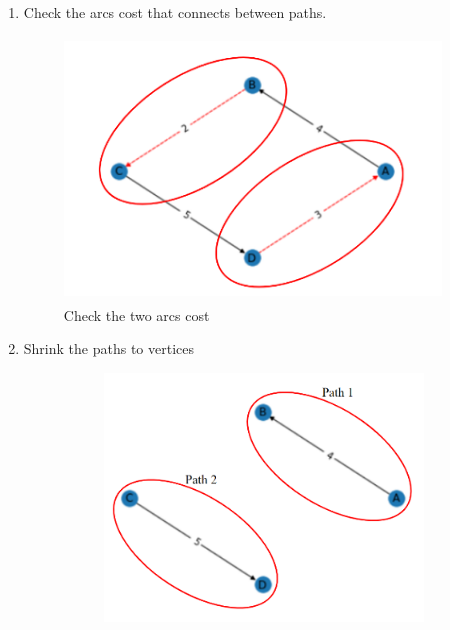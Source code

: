 \documentclass{article}
\begin{document}
\begin{enumerate}
    \item Check the arcs cost that connects between paths.
    \begin{figure}[H]
        \centering
        \includegraphics[width=10cm,height=7cm]{ex_img3.png}
        \caption{Check the two arcs cost}
    \end{figure}
    \newpage
    \item Shrink the paths to vertices
    \begin{figure}[H]
        \centering
        \begin{subfigure}{0.4\textwidth}
        \includegraphics[width=\textwidth]{ex_img4.png}
        

\end{subfigure}
\end{figure}
\end{enumerate}
\end{document}
